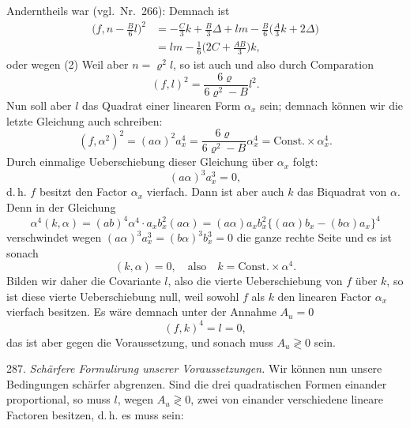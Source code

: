 Anderntheils war (vgl.\ Nr.\ 266):
Demnach ist
\[
\begin{aligned}
\Big(f,n-\frac{B}{6}l\Big)^2&=-\frac{C}{3}k+\frac{B}{3}\varDelta+lm-\frac{B}{6}\Big(\frac{A}{3}k+2\varDelta\Big)\\
&=lm-\frac{1}{6}\Big(2C+\frac{AB}{3}\Big)k,
\end{aligned}
\]
oder wegen (2)
Weil aber $n=\varrho^2l$, so ist auch
und also durch Comparation
\[
(f,l)^2=\frac{6\varrho}{6\varrho^2-B}l^2.
\]
Nun soll aber $l$ das Quadrat einer linearen Form $\alpha_x$ sein; demnach können wir die letzte Gleichung auch schreiben:
\[
(f,\alpha^2)^2=(a\alpha)^2a_x^4=\frac{6\varrho}{6\varrho^2-B}\alpha_x^4=\text{Const.}\times\alpha_x^4.
\]
Durch einmalige Ueberschiebung dieser Gleichung über $\alpha_x$ folgt:
\[
(a\alpha)^3a_x^3=0,
\]
d.\,h. $f$ besitzt den Factor $\alpha_x$ vierfach.
Dann ist aber auch $k$ das Biquadrat von $\alpha$. Denn in der Gleichung
\[
\alpha^4(k,\alpha)=(ab)^4\alpha^4\cdot a_xb_x^2(a\alpha)=(a\alpha)a_xb_x^2\{(a\alpha)b_x-(b\alpha)a_x\}^4
\]
verschwindet wegen $(a\alpha)^3a_x^3=(b\alpha)^3b_x^3=0$ die ganze rechte Seite und es ist sonach
\[
(k,\alpha)=0,\quad\text{also}\quad k=\text{Const.}\times\alpha^4.
\]
Bilden wir daher die Covariante $l$, also die vierte Ueberschiebung von $f$ über $k$, so ist diese vierte Ueberschiebung null, weil sowohl $f$ als $k$ den linearen Factor $\alpha_x$ vierfach besitzen. Es wäre demnach unter der Annahme $A_u=0$
\[
(f,k)^4=l=0,
\]
das ist aber gegen die Voraussetzung, und sonach muss $A_u\gtrless 0$ sein.

287. \textit{Schärfere Formulirung unserer Voraussetzungen.} Wir können nun unsere Bedingungen schärfer abgrenzen. Sind die drei quadratischen Formen einander proportional, so muss $l$, wegen $A_u\gtrless 0$, zwei von einander verschiedene lineare Factoren besitzen, d.\,h. es muss sein:



